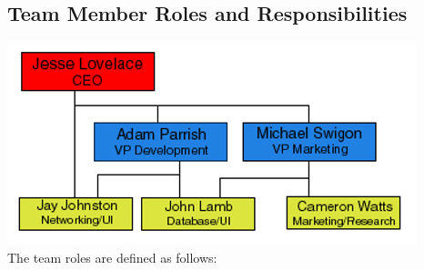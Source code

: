 \documentclass{report}
\begin{document}
    \subsection{Team Member Roles and Responsibilities}

    \includegraphics{organization.png}
    \\The team roles are defined as follows:
\end{document}
